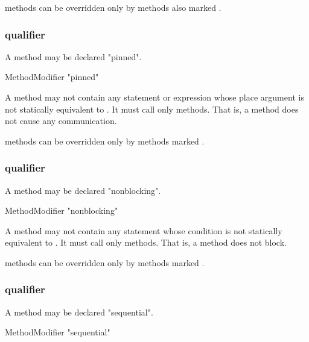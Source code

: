  methods can be overridden only by methods also marked .

\subsubsection{ qualifier}
\label{PinnedAnnotation}
\label{PinnedMethod}

A method may be declared \xcd"pinned".

\begin{grammar}
  MethodModifier \: \xcd"pinned"  
\end{grammar}

A  method may not
contain any  statement or expression whose place argument
is not statically equivalent to . It must call only
 methods. That is, a  method does not cause
any communication.

 methods can be overridden only by methods marked .

\subsubsection{ qualifier}
\label{NonblockingAnnotation}
\label{NonblockingMethod}

A method may be declared \xcd"nonblocking".

\begin{grammar}
  MethodModifier \: \xcd"nonblocking"  
\end{grammar}

A  method may not
contain any  statement whose condition
is not statically equivalent to . It must call only
 methods. That is, a  method does not block.

 methods can be overridden only by methods marked .

\subsubsection{ qualifier}
\label{SequentialAnnotation}
\label{SequentialMethod}

A method may be declared \xcd"sequential".

\begin{grammar}
  MethodModifier \: \xcd"sequential"  
\end{grammar}

